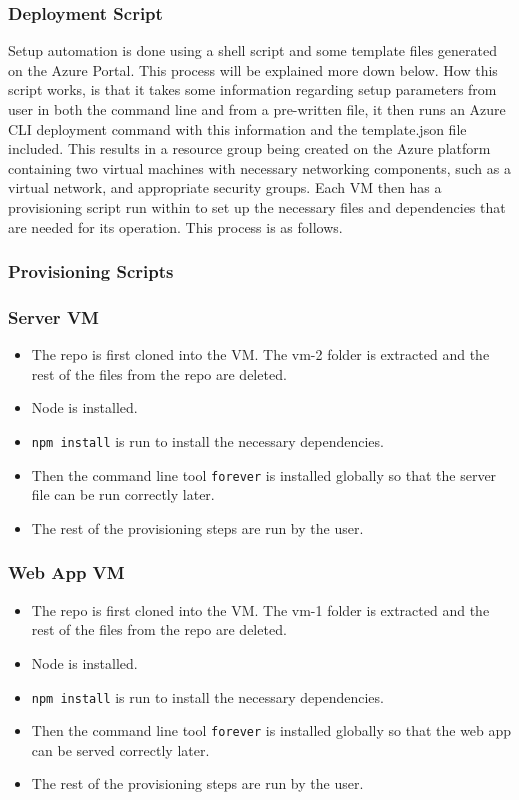 \documentclass[12pt]{extarticle}
\begin{document}
\subsubsection*{Deployment Script}
Setup automation is done using a shell script and some template files generated on the Azure Portal. This process will be explained more down below. How this script works, is that it takes some information regarding setup parameters from user in both the command line and from a pre-written file, it then runs an Azure CLI deployment command with this information and the template.json file included. This results in a resource group being created on the Azure platform containing two virtual machines with necessary networking components, such as a virtual network, and appropriate security groups. Each VM then has a provisioning script run within to set up the necessary files and dependencies that are needed for its operation. This process is as follows.
\subsubsection*{Provisioning Scripts}
\subsubsection*{Server VM}
\begin{itemize}
\item The repo is first cloned into the VM. The vm-2 folder is extracted and the rest of the files from the repo are deleted.
\item Node is installed.
\item \lstinline|npm install| is run to install the necessary dependencies.
\item Then the command line tool \lstinline|forever| is installed globally so that the server file can be run correctly later.
\item The rest of the provisioning steps are run by the user.
\end{itemize}

\subsubsection*{Web App VM}
\begin{itemize}
\item The repo is first cloned into the VM. The vm-1 folder is extracted and the rest of the files from the repo are deleted.
\item Node is installed.
\item \lstinline|npm install| is run to install the necessary dependencies.
\item Then the command line tool \lstinline|forever| is installed globally so that the web app can be served correctly later.
\item The rest of the provisioning steps are run by the user.
\end{itemize}
\end{document}
